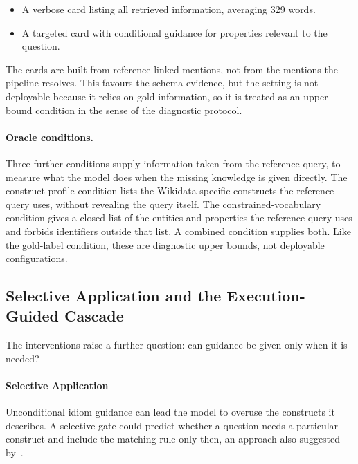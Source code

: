 \begin{itemize}
\item
A verbose card listing all retrieved information, averaging 329 words.
\item
A targeted card with conditional guidance for properties relevant to the question.

\end{itemize}

The cards are built from reference-linked mentions, not from the mentions the pipeline resolves.
This favours the schema evidence, but the setting is not deployable because it relies on gold information, so it is treated as an upper-bound condition in the sense of the diagnostic protocol.

\paragraph{Oracle conditions.}

Three further conditions supply information taken from the reference query, to measure what the model does when the missing knowledge is given directly.
The construct-profile condition lists the Wikidata-specific constructs the reference query uses, without revealing the query itself.
The constrained-vocabulary condition gives a closed list of the entities and properties the reference query uses and forbids identifiers outside that list.
A combined condition supplies both.
Like the gold-label condition, these are diagnostic upper bounds, not deployable configurations.

\subsection{Selective Application and the Execution-Guided
Cascade}

\label{sec:method-cascade}

The interventions raise a further question: can guidance be given only when it is needed?

\paragraph{Selective Application}

Unconditional idiom guidance can lead the model to overuse the constructs it describes.
A selective gate could predict whether a question needs a particular construct and include the matching rule only then, an approach also suggested by~\parencite{yang2026ggc}.

